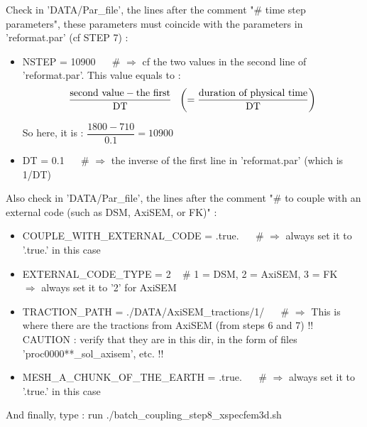 \documentclass[11pt]{article}
\newcommand{\ds}{\displaystyle}
\begin{document}
\medskip

\noindent Check in 'DATA/Par\_file', the lines after the comment "\# time step parameters", these parameters must coincide with the parameters in  'reformat.par' (cf STEP 7) :

\begin{itemize}

\item[\textbullet] NSTEP = 10900 ~~ \# $\Longrightarrow$ cf the two values in the second line of 'reformat.par'. This value equals to :
$$\ds \dfrac{\hbox{second value} - \hbox{the first}}{\text{DT}} ~~ \left(= \dfrac{\hbox{duration of physical time}}{\text{DT}} \right)$$

\noindent So here, it is : $\ds \dfrac{1800 - 710}{0.1} = 10900$

\medskip

\item[\textbullet] DT = 0.1 ~~ \# $\Longrightarrow$ the inverse of the first line in 'reformat.par' (which is 1/DT)

\end{itemize}

\medskip

\noindent Also check in 'DATA/Par\_file', the lines after the comment "\# to couple with an external code (such as DSM, AxiSEM, or FK)" :

\begin{itemize}

\item[\textbullet] COUPLE\_WITH\_EXTERNAL\_CODE = .true. ~~ \# $\Longrightarrow$ always set it to '.true.' in this case

\item[\textbullet] EXTERNAL\_CODE\_TYPE = 2  ~ \# 1 = DSM, 2 = AxiSEM, 3 = FK ~~ $\Longrightarrow$ always set it to '2' for AxiSEM

\item[\textbullet] TRACTION\_PATH  = ./DATA/AxiSEM\_tractions/1/ ~~   \# $\Longrightarrow$ This is where there are the tractions from AxiSEM (from steps 6 and 7) !! CAUTION : verify that they are in this dir, in the form of files 'proc0000**\_sol\_axisem', etc. !!

\item[\textbullet] MESH\_A\_CHUNK\_OF\_THE\_EARTH  = .true.  ~~  \# $\Longrightarrow$ always set it to '.true.' in this case

\end{itemize}

\medskip

\noindent And finally, type : run ./batch\_coupling\_step8\_xspecfem3d.sh

\end{document}
